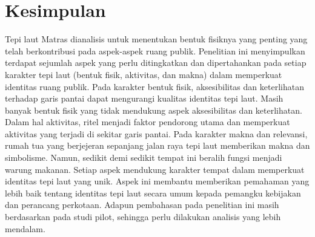 \documentclass[11pt]{simart} %
\begin{document}
\section{Kesimpulan}%
\label{sec:Kesimpulan}

Tepi laut Matras dianalisis untuk menentukan bentuk fisiknya yang penting yang telah berkontribusi pada aspek-aspek ruang publik. Penelitian ini menyimpulkan terdapat sejumlah aspek yang perlu ditingkatkan dan dipertahankan pada setiap karakter tepi laut (bentuk fisik, aktivitas, dan makna) dalam memperkuat identitas ruang publik. Pada karakter bentuk fisik, aksesibilitas dan keterlihatan terhadap garis pantai dapat mengurangi kualitas identitas tepi laut. Masih banyak bentuk fisik yang tidak mendukung aspek aksesibilitas dan keterlihatan. Dalam hal aktivitas, ritel menjadi faktor pendorong utama dan memperkuat aktivitas yang terjadi di sekitar garis pantai. Pada karakter makna dan relevansi, rumah tua yang berjejeran sepanjang jalan raya tepi laut memberikan makna dan simbolisme. Namun, sedikit demi sedikit tempat ini beralih fungsi menjadi warung makanan. Setiap aspek mendukung karakter tempat dalam memperkuat identitas tepi laut yang unik. Aspek ini membantu memberikan pemahaman yang lebih baik tentang identitas tepi laut secara umum kepada pemangku kebijakan dan perancang perkotaan. Adapun pembahasan pada penelitian ini masih berdasarkan pada studi pilot, sehingga perlu dilakukan analisis yang lebih mendalam.






% 

\end{document}
